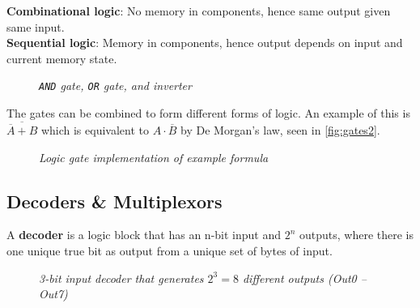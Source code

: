 \documentclass[11pt]{article}
\begin{document}
\begin{tcolorbox}[
    enhanced,
    attach boxed title to top left={xshift=6mm,yshift=-1.5mm},
    colback=moonstoneblue!20,
    colframe=moonstoneblue,
    colbacktitle=moonstoneblue,
    title=Two types of logic systems,
    fonttitle=\bfseries\color{white},
    boxed title style={size=small,colframe=moonstoneblue,sharp corners},
    sharp corners,
    label=box:logic-types,
]
    {\color{moondark}\textbf{Combinational logic}}: No memory in components, hence same output given same input. \\
    {\color{moondark}\textbf{Sequential logic}}: Memory in components, hence output depends on input and current memory state.
\end{tcolorbox}

\begin{figure}[htbp]
    \centering
    \caption{\textit{\texttt{AND} gate, \texttt{OR} gate, and inverter}}
\end{figure}

The gates can be combined to form different forms of logic. An example of this is $\overline{\overline{A} + B}$ which is equivalent to $A \cdot \overline{B}$ by De Morgan's law, seen in \autoref{fig:gates2}.

\begin{figure}[htbp]
    \centering
    \caption{\textit{Logic gate implementation of example formula}}
    \label{fig:gates2}
\end{figure}

\subsection*{Decoders \& Multiplexors}

A \textbf{decoder} is a logic block that has an n-bit input and $2^n$ outputs, where there is one unique true bit as output from a unique set of bytes of input.

\begin{figure}[htbp]
    \centering
    \caption{\textit{3-bit input decoder that generates $2^3=8$ different outputs (Out0 – Out7)}}
\end{figure}
\end{document}
